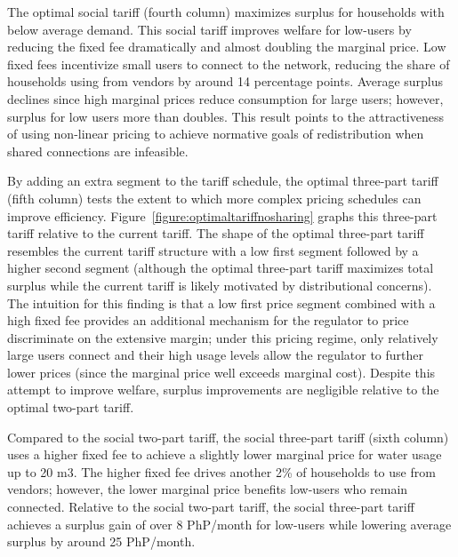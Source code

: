 \documentclass[12pt]{article}
\begin{document}
The optimal social tariff (fourth column) maximizes surplus for households with below average demand.  This social tariff improves welfare for low-users by reducing the fixed fee dramatically and almost doubling the marginal price.  Low fixed fees incentivize small users to connect to the network, reducing the share of households using from vendors by around 14 percentage points.  Average surplus declines since high marginal prices reduce consumption for large users; however, surplus for low users more than doubles.  This result points to the attractiveness of using non-linear pricing to achieve normative goals of redistribution when shared connections are infeasible.

By adding an extra segment to the tariff schedule, the optimal three-part tariff (fifth column) tests the extent to which more complex pricing schedules can improve efficiency.  Figure~\ref{figure:optimaltariffnosharing} graphs this three-part tariff relative to the current tariff.  The shape of the optimal three-part tariff resembles the current tariff structure with a low first segment followed by a higher second segment (although the optimal three-part tariff maximizes total surplus while the current tariff is likely motivated by distributional concerns).  The intuition for this finding is that a low first price segment combined with a high fixed fee provides an additional mechanism for the regulator to price discriminate on the extensive margin; under this pricing regime, only relatively large users connect and their high usage levels allow the regulator to further lower prices (since the marginal price well exceeds marginal cost).  Despite this attempt to improve welfare, surplus improvements are negligible relative to the optimal two-part tariff.  

Compared to the social two-part tariff, the social three-part tariff (sixth column) uses a higher fixed fee to achieve a slightly lower marginal price for water usage up to 20 m3.  The higher fixed fee drives another 2\% of households to use from vendors; however, the lower marginal price benefits low-users who remain connected.  Relative to the social two-part tariff, the social three-part tariff achieves a surplus gain of over 8 PhP/month for low-users while lowering average surplus by around 25 PhP/month.

\end{document}
